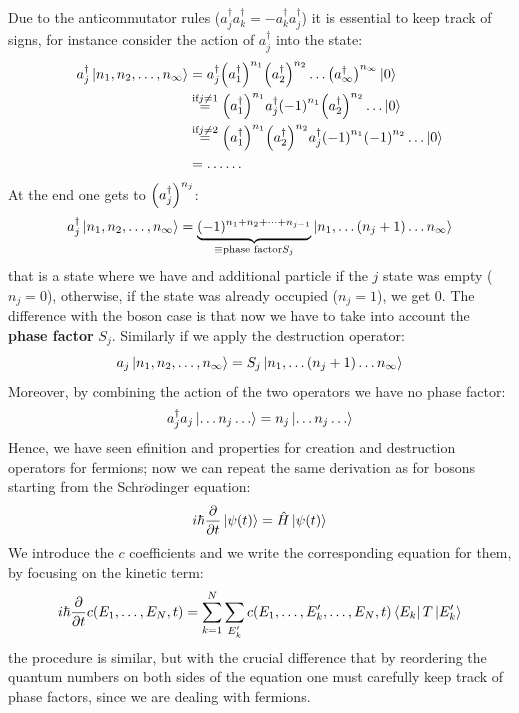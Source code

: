\documentclass[../main/main.tex]{subfiles}
\begin{document}
Due to the anticommutator rules (\( a_j ^\dag a_k ^\dag = - a_k ^\dag a_j ^\dag  \)) it is essential to keep track of signs, for instance consider the  action of \( a_j^\dag \) into the state: 
\begin{equation*}
\begin{split}
  a_j^\dag \ket{n_1, n_2, \dots, n_ \infty }  &= a_j ^\dag \qty(a_1 ^\dag )^{n_1} \qty(a_2 ^\dag )^{n_2}  \dots \qty(a_ \infty  ^\dag )^{n_ \infty }  \ket{0}  \\
  & \overset{\text{if} j \neq 1}{=}  \qty(a_1 ^\dag )^{n_1} a_j ^\dag \qty(-1)^{n_1} \qty(a_2 ^\dag )^{n_2}   \dots \ket{0} \\
  & \overset{\text{if} j \neq 2}{=} \qty(a_1 ^\dag )^{n_1} \qty(a_2 ^\dag )^{n_2}  a_j ^\dag \qty(-1)^{n_1} \qty(-1)^{n_2} \dots \ket{0} \\
  & = \dots \dots
\end{split}
\end{equation*}
At the end one gets to \( \qty(a_j ^\dag )^{n_j}  \):
\begin{equation*}
  a_j^\dag \ket{n_1, n_2, \dots, n_ \infty }  = \underbrace{(-1)^{n_1+n_2+ \dots + n_{j-1}}}_{\equiv \text{phase factor} S_j}  \ket{n_1, \dots(n_j+1) \dots n_ \infty }
\end{equation*}
that is a state where we have and additional particle if the \( j \) state was empty (\( n_j=0 \)), otherwise, if the state was already occupied (\( n_j=1 \)), we get 0. The difference with the boson case is that now we have to take into account the \textbf{phase factor} \( S_j \).
Similarly if we apply the destruction operator:
\begin{equation*}
  a_j \ket{n_1, n_2, \dots, n_ \infty }  = S_j \ket{n_1, \dots(n_j+1) \dots n_ \infty }
\end{equation*}
Moreover, by combining the action of the two operators we have no phase factor:
\begin{equation*}
  a_j ^\dag a_j \ket{\dots n_j \dots} = n_j \ket{\dots n_j \dots}
\end{equation*}
Hence, we have seen efinition and properties for creation and destruction operators for fermions; now  we can repeat the same derivation as for bosons starting from the Schr$\ddot{o}$dinger equation:
\begin{equation*}
  i \hbar \pdv{}{t} \ket{\psi (t)} = \hat{H} \ket{\psi (t)}
\end{equation*}
We introduce the \( c \) coefficients and we write the corresponding equation for them, by focusing on the kinetic term:
\begin{equation}
i \hbar \pdv{}{t} c(E_1, \dots, E_N, t) = \sum_{k=1}^{N}  \sum_{E_k'}^{} c(E_1, \dots, E_k', \dots, E_N,t) \bra{E_k} T \ket{E_k'}
\end{equation}
the procedure is similar, but with the crucial difference that by reordering the quantum numbers on both sides of the equation one must carefully keep track of phase factors, since we are dealing with fermions.
\end{document}
